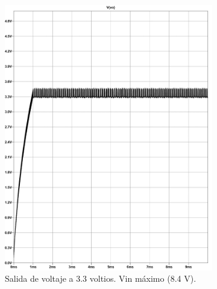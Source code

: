 \begin{figure}[h]
  \centering
  \begin{subfigure}{0.48\linewidth}
    \includegraphics[width=\textwidth]{Pictures/Convertidor DC-DC MC34063A, 2s2p, bus 3.3 v a 750 mA_page-0001 Max.jpg}
    \caption{Salida de voltaje a 3.3 voltios. Vin máximo (8.4 V).}
    \label{fig:2s2p_33v_2dcdcconverters_Max}
  \end{subfigure}
  \hfill
  \begin{subfigure}{0.48\linewidth}

\end{subfigure}
\end{figure}
